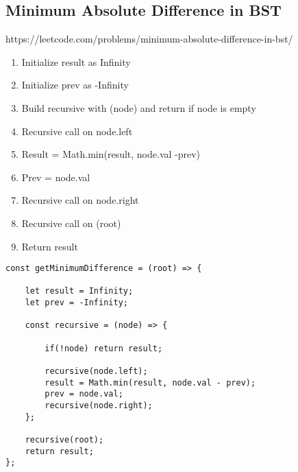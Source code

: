 \documentclass[10pt]{article}
\begin{document}
\medskip %















\pagebreak
\medskip   
\subsection {Minimum Absolute Difference in BST}
https://leetcode.com/problems/minimum-absolute-difference-in-bst/

\begin{enumerate}
	\item Initialize result as Infinity
	\item Initialize prev as -Infinity
	\item Build recursive with (node) and return if node is empty
	\item Recursive call on node.left 
	\item Result = Math.min(result, node.val -prev)
	\item Prev = node.val
	\item Recursive call on node.right
	\item Recursive call on (root)
	\item Return result
\end{enumerate}

\begin{lstlisting}[title=Solution getMinimumDifference, captionpos=t]
const getMinimumDifference = (root) => {
    
    let result = Infinity;
    let prev = -Infinity;
    
    const recursive = (node) => {
    
        if(!node) return result;
        
        recursive(node.left);
        result = Math.min(result, node.val - prev);
        prev = node.val;
        recursive(node.right);
    };
    
    recursive(root);
    return result;
};
\end{lstlisting}

\medskip %











\pagebreak
\medskip   
\end{document}
